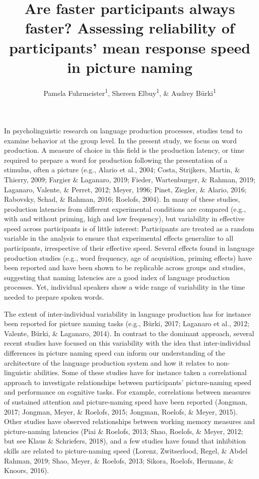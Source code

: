 \documentclass[
  man,floatsintext]{apa6}
\title{Are faster participants always faster? Assessing reliability of participants' mean response speed in picture naming}
\author{Pamela Fuhrmeister\textsuperscript{1}, Shereen Elbuy\textsuperscript{1}, \& Audrey Bürki\textsuperscript{1}}
\date{}
\affiliation{\vspace{0.5cm}\textsuperscript{1} Universität Potsdam}
\begin{document}
\maketitle

In psycholinguistic research on language production processes, studies tend to examine behavior at the group level. In the present study, we focus on word production. A measure of choice in this field is the production latency, or time required to prepare a word for production following the presentation of a stimulus, often a picture (e.g., Alario et al., 2004; Costa, Strijkers, Martin, \& Thierry, 2009; Fargier \& Laganaro, 2019; Fieder, Wartenburger, \& Rahman, 2019; Laganaro, Valente, \& Perret, 2012; Meyer, 1996; Pinet, Ziegler, \& Alario, 2016; Rabovsky, Schad, \& Rahman, 2016; Roelofs, 2004). In many of these studies, production latencies from different experimental conditions are compared (e.g., with and without priming, high and low frequency), but variability in effective speed across participants is of little interest: Participants are treated as a random variable in the analysis to ensure that experimental effects generalize to all participants, irrespective of their effective speed. Several effects found in language production studies (e.g., word frequency, age of acquisition, priming effects) have been reported and have been shown to be replicable across groups and studies, suggesting that naming latencies are a good index of language production processes. Yet, individual speakers show a wide range of variability in the time needed to prepare spoken words.

The extent of inter-individual variability in language production has for instance been reported for picture naming tasks (e.g., Bürki, 2017; Laganaro et al., 2012; Valente, Bürki, \& Laganaro, 2014). In contrast to the dominant approach, several recent studies have focused on this variability with the idea that inter-individual differences in picture naming speed can inform our understanding of the architecture of the language production system and how it relates to non-linguistic abilities. Some of these studies have for instance taken a correlational approach to investigate relationships between participants' picture-naming speed and performance on cognitive tasks. For example, correlations between measures of sustained attention and picture-naming speed have been reported (Jongman, 2017; Jongman, Meyer, \& Roelofs, 2015; Jongman, Roelofs, \& Meyer, 2015). Other studies have observed relationships between working memory measures and picture-naming latencies (Piai \& Roelofs, 2013; Shao, Roelofs, \& Meyer, 2012; but see Klaus \& Schriefers, 2018), and a few studies have found that inhibition skills are related to picture-naming speed (Lorenz, Zwitserlood, Regel, \& Abdel Rahman, 2019; Shao, Meyer, \& Roelofs, 2013; Sikora, Roelofs, Hermans, \& Knoors, 2016).
\end{document}
